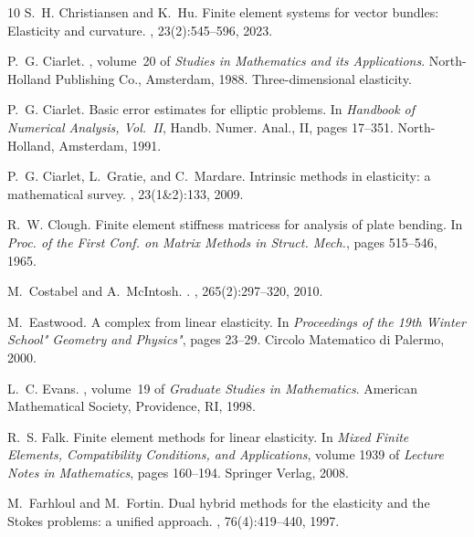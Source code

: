 \documentclass[12pt]{amsart}
\numberwithin{equation}{section}
\theoremstyle{definition}
\theoremstyle{remark}
\renewcommand{\(}{\bigl(}
\renewcommand{\)}{\bigr)}
\begin{document}
\begin{thebibliography}{10}
S.~H. Christiansen and K.~Hu.
\newblock Finite element systems for vector bundles: Elasticity and curvature.
, 23(2):545--596, 2023.

P.~G. Ciarlet.
, volume~20 of {\em Studies
  in Mathematics and its Applications}.
\newblock North-Holland Publishing Co., Amsterdam, 1988.
\newblock Three-dimensional elasticity.

P.~G. Ciarlet.
\newblock Basic error estimates for elliptic problems.
\newblock In {\em Handbook of Numerical Analysis, {V}ol.\ {II}}, Handb. Numer.
  Anal., II, pages 17--351. North-Holland, Amsterdam, 1991.

P.~G. Ciarlet, L.~Gratie, and C.~Mardare.
\newblock Intrinsic methods in elasticity: a mathematical survey.
, 23(1\&2):133, 2009.

R.~W. Clough.
\newblock Finite element stiffness matricess for analysis of plate bending.
\newblock In {\em Proc. of the First Conf. on Matrix Methods in Struct. Mech.},
  pages 515--546, 1965.

M.~Costabel and A.~McIntosh.
.
, 265(2):297--320, 2010.

M.~Eastwood.
\newblock A complex from linear elasticity.
\newblock In {\em Proceedings of the 19th Winter School" Geometry and
  Physics"}, pages 23--29. Circolo Matematico di Palermo, 2000.

L.~C. Evans.
, volume~19 of {\em Graduate
  Studies in Mathematics}.
\newblock American Mathematical Society, Providence, RI, 1998.

R.~S. Falk.
\newblock Finite element methods for linear elasticity.
\newblock In {\em Mixed Finite Elements, Compatibility Conditions, and
  Applications}, volume 1939 of {\em Lecture Notes in Mathematics}, pages
  160--194. Springer Verlag, 2008.

M.~Farhloul and M.~Fortin.
\newblock Dual hybrid methods for the elasticity and the {S}tokes problems: a
  unified approach.
, 76(4):419--440, 1997.


\end{thebibliography}
\end{document}
